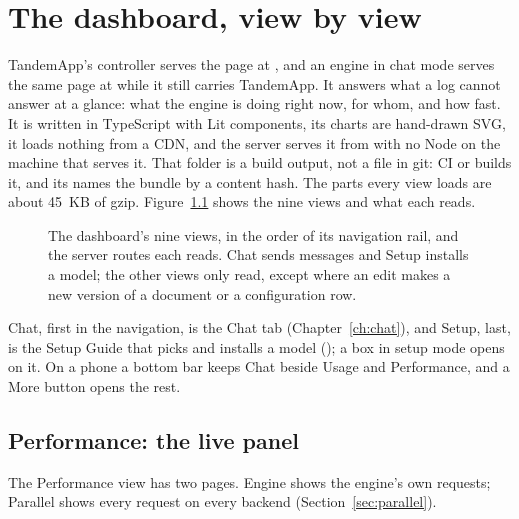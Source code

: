 \chapter{The dashboard, view by view}\label{ch:dashboard}

TandemApp's controller serves the page at , and an engine in chat mode serves the same page at  while it still carries TandemApp. It answers what a log cannot answer at a glance: what the engine is doing right now, for whom, and how fast. It is written in TypeScript with Lit components, its charts are hand-drawn SVG, it loads nothing from a CDN, and the server serves it from  with no Node on the machine that serves it. That folder is a build output, not a file in git: CI or  builds it, and its  names the bundle by a content hash. The parts every view loads are about 45~KB of gzip. Figure~\ref{fig:dashboard-map} shows the nine views and what each reads.

\begin{figure}[htbp]
\centering

\caption[The dashboard's views]{The dashboard's nine views, in the order of its navigation rail, and the server routes each reads. Chat sends messages and Setup installs a model; the other views only read, except where an edit makes a new version of a document or a configuration row.}\label{fig:dashboard-map}
\end{figure}

Chat, first in the navigation, is the Chat tab (Chapter~\ref{ch:chat}), and Setup, last, is the Setup Guide that picks and installs a model (); a box in setup mode opens on it. On a phone a bottom bar keeps Chat beside Usage and Performance, and a More button opens the rest.

\section{Performance: the live panel}

The Performance view has two pages. Engine shows the engine's own requests; Parallel shows every request on every backend (Section~\ref{sec:parallel}).


